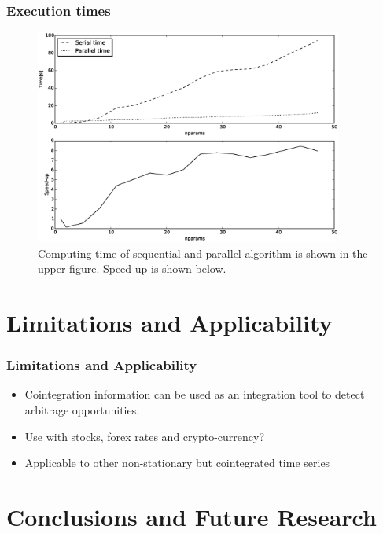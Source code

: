 \documentclass{beamer}
\begin{document}
%
\begin{frame}
\frametitle{Execution times}
\begin{figure}[ht]
  \centering
  \includegraphics[width=0.9\textwidth]{img/51_Fig3}
  \caption[Computing time and Speed-up]{Computing time of sequential and parallel algorithm is shown in the
  upper figure. Speed-up is shown below.}
  \label{fig:extimes}
\end{figure}
\end{frame}

\section{Limitations and Applicability}

\begin{frame}
\frametitle{Limitations and Applicability}
\begin{itemize}
\item Cointegration information can be used as an integration tool to detect arbitrage opportunities.
\item Use with stocks, forex rates and crypto-currency?
\item Applicable to other non-stationary but cointegrated time series
\end{itemize}
\end{frame}

\section{Conclusions and Future Research}
\end{document}
